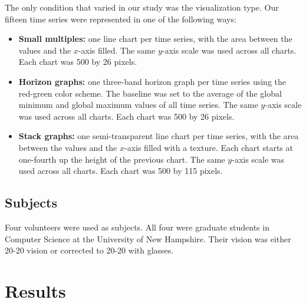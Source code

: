 \documentclass{article}
\begin{document}
The only condition that varied in our study was the visualization type.  Our fifteen time series were represented in one of the following ways:

\begin{itemize}
\item \textbf{Small multiples:} one line chart per time series, with the area between the values and the $x$-axis filled. The same $y$-axis scale was used across all charts.  Each chart was 500 by 26 pixels.
\item \textbf{Horizon graphs:} one three-band horizon graph per time series using the red-green color scheme.  The baseline was set to the average of the global minimum and global maximum values of all time series.  The same $y$-axis scale was used across all charts.  Each chart was 500 by 26 pixels.
\item \textbf{Stack graphs:}  one semi-transparent line chart per time series, with the area between the values and the $x$-axis filled with a texture. Each chart starts at one-fourth up the height of the previous chart. The same $y$-axis scale was used across all charts.  Each chart was 500 by 115 pixels.
\end{itemize}

\subsection{Subjects}

Four volunteers were used as subjects.  All four were graduate students in Computer Science at the University of New Hampshire.  Their vision was either 20-20 vision or corrected to 20-20 with glasses.

\section{Results}
\end{document}
